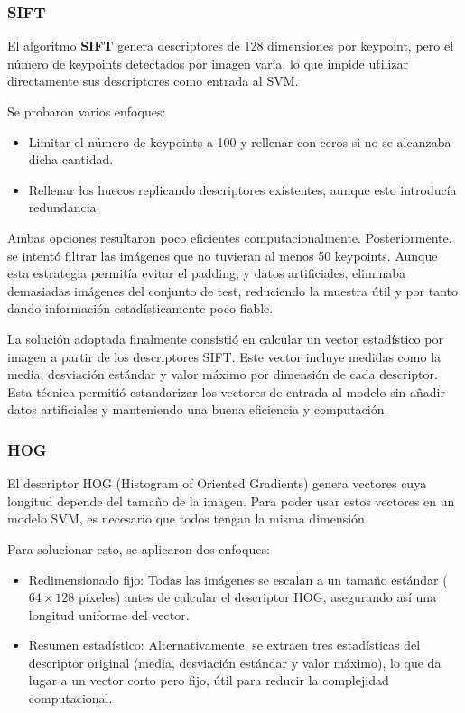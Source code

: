 \documentclass[a4paper]{article}
\begin{document}
\subsubsection*{SIFT}

El algoritmo \textbf{SIFT} genera descriptores de 128 dimensiones por keypoint, pero el número de keypoints detectados por imagen varía, lo que impide utilizar directamente sus descriptores como entrada al SVM.
\par\vspace{0.5cm}

Se probaron varios enfoques:
\par\vspace{0.5cm}

\begin{itemize}
    \item Limitar el número de keypoints a 100 y rellenar con ceros si no se alcanzaba dicha cantidad.
    \item Rellenar los huecos replicando descriptores existentes, aunque esto introducía redundancia.
\end{itemize}

Ambas opciones resultaron poco eficientes computacionalmente. Posteriormente, se intentó filtrar las imágenes que no tuvieran al menos 50 keypoints. Aunque esta estrategia permitía evitar el padding, y datos artificiales, eliminaba demasiadas imágenes del conjunto de test, reduciendo la muestra útil y por tanto dando información estadísticamente poco fiable.
\par\vspace{0.5cm}

La solución adoptada finalmente consistió en calcular un vector estadístico por imagen a partir de los descriptores SIFT. Este vector incluye medidas como la media, desviación estándar y valor máximo por dimensión de cada descriptor. Esta técnica permitió estandarizar los vectores de entrada al modelo sin añadir datos artificiales y manteniendo una buena eficiencia y computación.


\subsubsection*{HOG}

El descriptor HOG (Histogram of Oriented Gradients) genera vectores cuya longitud depende del tamaño de la imagen. 
Para poder usar estos vectores en un modelo SVM, es necesario que todos tengan la misma dimensión.

Para solucionar esto, se aplicaron dos enfoques:
\begin{itemize}
    \item Redimensionado fijo: Todas las imágenes se escalan a un tamaño estándar (\(64\times128\) píxeles) antes de calcular el descriptor HOG, asegurando así una longitud uniforme del vector.
    \item Resumen estadístico: Alternativamente, se extraen tres estadísticas del descriptor original (media, desviación estándar y valor máximo), lo que da lugar a un vector corto pero fijo, útil para reducir la complejidad computacional.
\end{itemize}
\end{document}
